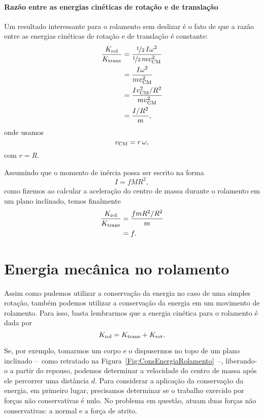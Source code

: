 \paragraph{Razão entre as energias cinéticas de rotação e de translação}

Um resultado interessante para o rolamento sem deslizar é o fato de que a razão entre as energias cinéticas de rotação e de translação é constante:
\begin{align}
    \frac{K_{\rm{rol}}}{K_{\rm{trans}}} &= \frac{\nicefrac{1}{2} \, I \omega^2}{\nicefrac{1}{2} \, m v_{\rm{CM}}^2} \\
    &= \frac{I \omega^2}{m v_{\rm{CM}}^2} \\
    &= \frac{I v_{\rm{CM}}^2/R^2}{m v_{\rm{CM}}^2} \\
    &= \frac{I /R^2}{m},
\end{align}
%
onde usamos
\begin{equation}
    v_{\rm{CM}} = r\,\omega,
\end{equation}
%
com $r = R$.

Assumindo que o momento de inércia possa ser escrito na forma
\begin{equation}
    I = f MR^2,
\end{equation}
%
como fizemos ao calcular a aceleração do centro de massa durante o rolamento em um plano inclinado, temos finalmente
\begin{align}
    \frac{K_{\rm{rol}}}{K_{\rm{trans}}} &= \frac{f mR^2 /R^2}{m} \\
    &= f.
\end{align}

\section{Energia mecânica no rolamento}

Assim como pudemos utilizar a conservação da energia no caso de uma simples rotação, também podemos utilizar a conservação da energia em um movimento de rolamento. Para isso, basta lembrarmos que a energia cinética para o rolamento é dada por
\begin{equation}
    K_{\rm{rol}} = K_{\rm{trans}} + K_{\rm{rot}}.
\end{equation}

Se, por exemplo, tomarmos um corpo e o dispusermos no topo de um plano inclinado --~como retratado na Figura~\ref{Fig:ConsEnergiaRolamento}~--, liberando-o a partir do repouso, podemos determinar a velocidade do centro de massa após ele percorrer uma distância $d$. Para considerar a aplicação da conservação da energia, em primeiro lugar, precisamos determinar se o trabalho exercido por forças não conservativas é nulo. No problema em questâo, atuam duas forças não conservativas: a normal e a força de atrito.

